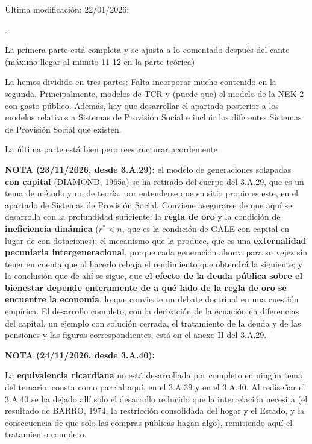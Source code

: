 \documentclass[10pt,a4paper]{article}
\newcounter{numitem}
\newcommand{\modificaciones}[1]{
  \begin{tcolorbox}[
    colback=white,
    colframe=red,
    title={Modificaciones a realizar},
    before upper={\setlength{\parindent}{0.5cm}\setlength{\parskip}{0.5\baselineskip}}
  ]
  #1
  \end{tcolorbox}
}
\newenvironment{lnum}
      {\begin{list}{\arabic{numitem}.}{%
          \usecounter{numitem}%
          \setlength{\leftmargin}{1cm}%
          \setlength{\parskip}{3pt}%
          \setlength{\itemsep}{0pt}%
          \setlength{\parsep}{0pt}%
      }}
      {\end{list}}
\newcounter{anexo}
\begin{document}
\modificaciones{
    Última modificación: 22/01/2026:
    \begin{lnum}
        \item La primera parte está completa y se ajusta a lo comentado después del cante (máximo llegar al minuto 11-12 en la parte teórica)
        \item La hemos dividido en tres partes: Falta incorporar mucho contenido en la segunda. Principalmente, modelos de TCR y (puede que) el modelo de la NEK-2 con gasto público. Además, hay que desarrollar el apartado posterior a los modelos relativos a Sistemas de Provisión Social e incluir los diferentes Sistemas de Provisión Social que existen.
        \item La última parte está bien pero reestructurar acordemente
    \end{lnum}

    \textbf{NOTA (23/11/2026, desde 3.A.29):} el modelo de generaciones solapadas \textbf{con capital} (DIAMOND, 1965a) se ha retirado del cuerpo del 3.A.29, que es un tema de método y no de teoría, por entenderse que su sitio propio es este, en el apartado de Sistemas de Provisión Social. Conviene asegurarse de que aquí se desarrolla con la profundidad suficiente: la \textbf{regla de oro} y la condición de \textbf{ineficiencia dinámica} ($r^{*}<n$, que es la condición de GALE con capital en lugar de con dotaciones); el mecanismo que la produce, que es una \textbf{externalidad pecuniaria intergeneracional}, porque cada generación ahorra para su vejez sin tener en cuenta que al hacerlo rebaja el rendimiento que obtendrá la siguiente; y la conclusión que de ahí se sigue, que \textbf{el efecto de la deuda pública sobre el bienestar depende enteramente de a qué lado de la regla de oro se encuentre la economía}, lo que convierte un debate doctrinal en una cuestión empírica. El desarrollo completo, con la derivación de la ecuación en diferencias del capital, un ejemplo con solución cerrada, el tratamiento de la deuda y de las pensiones y las figuras correspondientes, está en el anexo II del 3.A.29.
    

    \textbf{NOTA (24/11/2026, desde 3.A.40):} {\color{magenta}La \textbf{equivalencia ricardiana} no está desarrollada por completo en ningún tema del temario: consta como parcial aquí, en el 3.A.39 y en el 3.A.40. Al rediseñar el 3.A.40 se ha dejado allí solo el desarrollo reducido que la interrelación necesita (el resultado de BARRO, 1974, la restricción consolidada del hogar y el Estado, y la consecuencia de que solo las compras públicas hagan algo), remitiendo aquí el tratamiento completo.

}}
\end{document}
